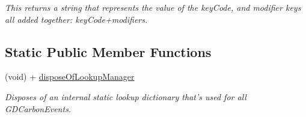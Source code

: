 \begin{DoxyCompactItemize}
\begin{DoxyCompactList}\small\item\em This returns a string that represents the value of the keyCode, and modifier keys all added together: keyCode+modifiers. \item\end{DoxyCompactList}\end{DoxyCompactItemize}
\subsection*{Static Public Member Functions}
\begin{DoxyCompactItemize}
\item 
(void) + \hyperlink{interface_g_d_carbon_event_aa9b7f189c2fdbe7d0424803cd3e7f936}{disposeOfLookupManager}
\begin{DoxyCompactList}\small\item\em Disposes of an internal static lookup dictionary that's used for all GDCarbonEvents. \item\end{DoxyCompactList}\end{DoxyCompactItemize}
